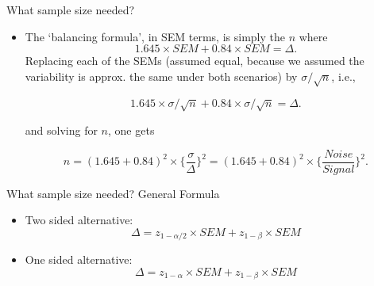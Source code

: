 \documentclass[10pt,handout]{beamer}\usepackage[]{graphicx}\usepackage[]{color}
\begin{document}
\begin{frame}{What sample size needed?}
	
	\begin{itemize}
		\setlength\itemsep{1em}
		\item The `balancing formula', in SEM terms, is simply the $n$ where
		$$ 1.645 \times SEM + 0.84 \times SEM = \Delta.$$
		Replacing each of the  SEMs (assumed equal, because we assumed the variability
		is approx. the same under both scenarios) by $\sigma/\sqrt{n}$,  i.e.,
		
		$$ 1.645 \times \sigma/\sqrt{n} + 0.84 \times \sigma/\sqrt{n} = \Delta.$$
		
		and solving for $n$, one gets
		
		$$  n = (1.645 + 0.84)^2  \times \bigg\{ \frac{\sigma}{\Delta} \bigg\}^2 = 
		(1.645 + 0.84)^2  \times \bigg\{ \frac{Noise}{Signal} \bigg\}^2 .$$
	\end{itemize}
	
\end{frame}

\begin{frame}{What sample size needed? General Formula}
	
	\begin{itemize}
		\setlength\itemsep{2em}
		\item Two sided alternative:
		$$\Delta = z_{1-\alpha/2} \times SEM + z_{1-\beta} \times SEM$$
		
		\item One sided alternative:
		$$\Delta = z_{1-\alpha} \times SEM + z_{1-\beta} \times SEM$$
	\end{itemize}
	
\end{frame}
\end{document}
